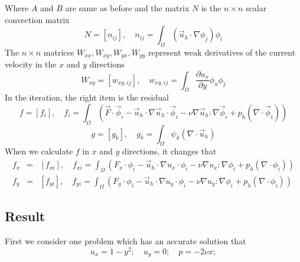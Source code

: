 \documentclass[a4paper]{article}
\begin{document}
Where $A$ and $B$ are same as before and the matrix $N$ is the $n\times n$ scalar convection matrix
\begin{equation}
N = [n_{ij}], \quad n_{ij} = \int_{\Omega} (\vec{u}_h\cdot \nabla\phi_j)\phi_i
\label{mt::N}
\end{equation}
The $n\times n$ matrices $W_{xx}, W_{xy}, W_{yx}, W_{yy}$ represent weak derivatives of the current velocity in the $x$ and $y$ directions
\begin{equation}
W_{xy} = [w_{xy,ij}],\quad w_{xy,ij} = \int_{\Omega} \frac{\partial u_x}{\partial y}\phi_u \phi_j
\label{mt::W}
\end{equation}
In the iteration, the right item is the residual
\begin{equation}
f = [f_i],\quad f_i=\int_{\Omega}(\vec{F}\cdot\vec{\phi}_i-\vec{u}_h\cdot\nabla\vec{u}_h\cdot\vec{\phi}_i-\nu\nabla\vec{u}_h:\nabla\vec{\phi}_i+p_h(\nabla\cdot\vec{\phi}_i))
\end{equation}
\begin{equation}
g = [g_k],\quad g_k=\int_{\Omega}\psi_k(\nabla \cdot \vec{u}_h)
\end{equation}
When we calculate $f$ in $x$ and $y$ directions, it changes that
\begin{equation}
\begin{array}{rcl}
f_x &=& [f_{xi}],\quad f_{xi}=\int_{\Omega}(F_x\cdot\phi_i-\vec{u}_h\cdot\nabla u_x\cdot\phi_i-\nu\nabla u_x:\nabla\phi_i+p_h(\nabla\cdot\phi_i)) \\
f_y &=& [f_{yi}],\quad f_{yi}=\int_{\Omega}(F_y\cdot\phi_i-\vec{u}_h\cdot\nabla u_y\cdot\phi_i-\nu\nabla u_y:\nabla\phi_i+p_h(\nabla\cdot\phi_i))
\label{mt::f}
\end{array}
\end{equation}
\subsection{Result}
First we consider one problem which has an accurate solution that
\begin{equation}
u_x = 1-y^2;\quad u_y = 0;\quad p=-2\nu x;
\label{pr::accurate}
\end{equation}
\end{document}
